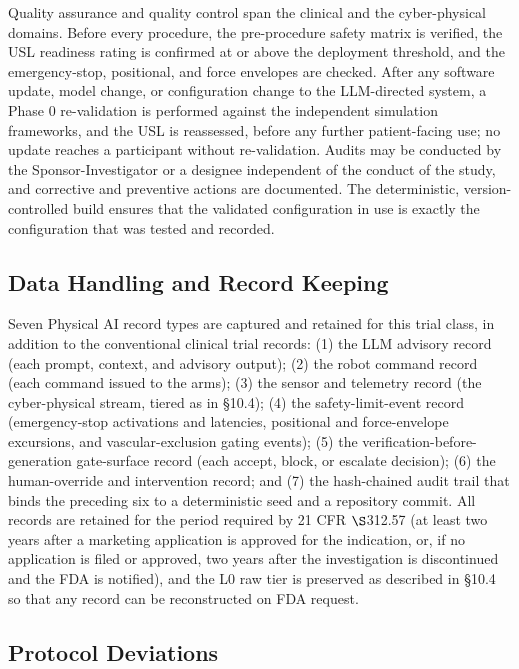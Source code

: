 Quality assurance and quality control span the clinical and the cyber-physical
domains. Before every procedure, the pre-procedure safety matrix is verified, the
USL readiness rating is confirmed at or above the deployment threshold, and the
emergency-stop, positional, and force envelopes are checked. After any software
update, model change, or configuration change to the LLM-directed system, a
Phase 0 re-validation is performed against the independent simulation frameworks,
and the USL is reassessed, before any further patient-facing use; no update reaches
a participant without re-validation. Audits may be conducted by the
Sponsor-Investigator or a designee independent of the conduct of the study, and
corrective and preventive actions are documented. The deterministic, version-controlled
build ensures that the validated configuration in use is exactly the configuration
that was tested and recorded.

\subsection{Data Handling and Record Keeping}

Seven Physical AI record types are captured and retained for this trial class, in
addition to the conventional clinical trial records: (1) the LLM advisory record
(each prompt, context, and advisory output); (2) the robot command record (each
command issued to the arms); (3) the sensor and telemetry record (the
cyber-physical stream, tiered as in \S10.4); (4) the safety-limit-event record
(emergency-stop activations and latencies, positional and force-envelope
excursions, and vascular-exclusion gating events); (5) the
verification-before-generation gate-surface record (each accept, block, or
escalate decision); (6) the human-override and intervention record; and (7) the
hash-chained audit trail that binds the preceding six to a deterministic seed and a
repository commit. All records are retained for the period required by 21 CFR
$\S$312.57 (at least two years after a marketing application is approved for the
indication, or, if no application is filed or approved, two years after the
investigation is discontinued and the FDA is notified), and the L0 raw tier is
preserved as described in \S10.4 so that any record can be reconstructed on FDA
request.

\subsection{Protocol Deviations}

